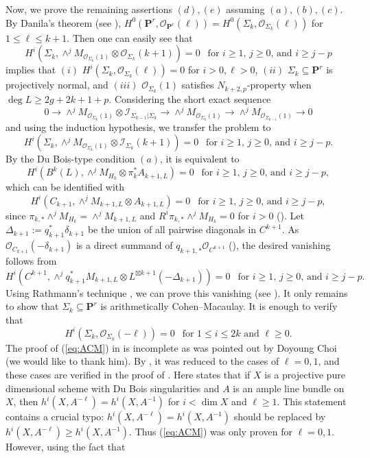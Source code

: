 \documentclass[graybox]{svmult}
\newcommand{\sO}{\mathscr{O}}
\newcommand{\sI}{\mathscr{I}}
\def\nP{\mathbf{P}}
\begin{document}
Now, we prove the remaining assertions $(d),(e)$ assuming $(a),(b),(c)$. By Danila's theorem (see \cite{ENP2}), $H^0(\nP^r, \sO_{\nP^r}(\ell)) = H^0(\Sigma_k, \sO_{\Sigma_k}(\ell))$ for $1 \leq \ell \leq k+1$. Then one can easily see that
$$
H^i(\Sigma_k, \wedge^j M_{\sO_{\Sigma_k}(1)} \otimes \sO_{\Sigma_k}(k+1))=0~~\text{ for $i \geq 1$, $j \geq 0$, and $i \geq j-p$}
$$
implies that $(i)$ $H^i(\Sigma_k, \sO_{\Sigma_k}(\ell))=0$ for $i>0, \ell>0$, $(ii)$ $\Sigma_k \subseteq \nP^r$ is projectively normal, and $(iii)$ $\sO_{\Sigma_k}(1)$ satisfies $N_{k+2,p}$-property when $\deg L \geq 2g+2k+1+p$. Considering the short exact sequence 
$$
0 \longrightarrow \wedge^j M_{\sO_{\Sigma_k}(1)} \otimes \sI_{\Sigma_{k-1}|\Sigma_k} \longrightarrow \wedge^j M_{\sO_{\Sigma_k}(1)} \longrightarrow \wedge^j M_{\sO_{\Sigma_{k-1}}(1)} \longrightarrow 0
$$
and using the induction hypothesis, we transfer the problem to 
$$
H^i(\Sigma_k, \wedge^j M_{\sO_{\Sigma_k}(1)} \otimes \sI_{\Sigma_k}(k+1))=0~~\text{ for $i \geq 1$, $j \geq 0$, and $i \geq j-p$}.
$$
By the Du Bois-type condition $(a)$, it is equivalent to 
$$
H^i(B^k(L), \wedge^j M_{H_k} \otimes \pi_k^* A_{k+1, L})=0~~\text{ for $i \geq 1$, $j \geq 0$, and $i \geq j-p$},
$$
which can be identified with
$$
H^i(C_{k+1}, \wedge^j M_{k+1, L} \otimes A_{k+1, L})=0~~\text{ for $i \geq 1$, $j \geq 0$, and $i \geq j-p$},
$$
since $\pi_{k,*}\wedge^j M_{H_k} = \wedge^j M_{k+1, L}$ and $R^i \pi_{k,*}\wedge^j M_{H_k} = 0$ for $i>0$ (\cite[Lemma 5.1]{ENP1}). Let $\Delta_{k+1}:=q_{k+1}^*\delta_{k+1}$ be the union of all pairwise diagonals in $C^{k+1}$. As $\sO_{C_{k+1}}(-\delta_{k+1})$ is a direct summand of $q_{k+1,*}\sO_{C^{k+1}}$ (\cite[Lemma 3.5]{ENP1}), the desired vanishing follows from
$$
H^i(C^{k+1}, \wedge^j q_{k+1}^* M_{k+1,L} \otimes L^{\boxtimes k+1}(-\Delta_{k+1}))=0~~\text{ for $i \geq 1$, $j \geq 0$, and $i \geq j-p$}.
$$
Using Rathmann's technique \cite{Rathmann1}, we can prove this vanishing (see \cite[Theorem 4.1]{ENP1}). It only remains to show that $\Sigma_k \subseteq \nP^r$ is arithmetically Cohen--Macaulay. It is enough to verify that
\begin{equation}\label{eq:ACM}
H^i(\Sigma_k, \sO_{\Sigma_k}(-\ell))=0~~\text{ for $1 \leq i \leq 2k$ and $\ell \geq 0$}.
\end{equation}
The proof of (\ref{eq:ACM}) in \cite{ENP1} is incomplete as was pointed out by Doyoung Choi (we would like to thank him). By \cite[Theorem 10.42]{Kollar}, it was reduced to the cases of $\ell = 0,1$, and these cases are verified in the proof of \cite[Theorem 5.8]{ENP1}. Here \cite[Theorem 10.42]{Kollar} states that if $X$ is a projective pure dimensional scheme with Du Bois singularities and $A$ is an ample line bundle on $X$, then $h^i(X, A^{-\ell}) = h^i(X, A^{-1})$ for $i< \dim X$ and $\ell \geq 1$. This statement  contains a crucial typo: $h^i(X, A^{-\ell}) = h^i(X, A^{-1})$ should be replaced by $h^i(X, A^{-\ell}) \geq h^i(X, A^{-1})$. Thus  (\ref{eq:ACM}) was only proven for $\ell=0,1$. However, using the fact that 
\end{document}
